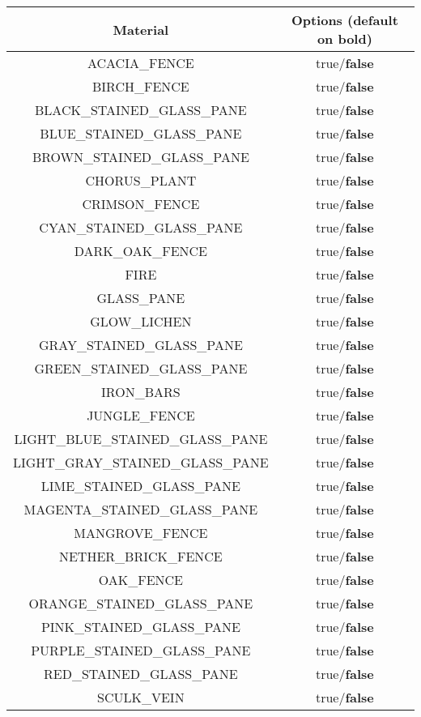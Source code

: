 \begin{longtable}{ |c|c| }
	\hline
	Material & Options (default on bold) \\
	\hline
	\endhead
	ACACIA\_FENCE & true/\textbf{false} \\
	BIRCH\_FENCE & true/\textbf{false} \\
	BLACK\_STAINED\_GLASS\_PANE & true/\textbf{false} \\
	BLUE\_STAINED\_GLASS\_PANE & true/\textbf{false} \\
	BROWN\_STAINED\_GLASS\_PANE & true/\textbf{false} \\
	CHORUS\_PLANT & true/\textbf{false} \\
	CRIMSON\_FENCE & true/\textbf{false} \\
	CYAN\_STAINED\_GLASS\_PANE & true/\textbf{false} \\
	DARK\_OAK\_FENCE & true/\textbf{false} \\
	FIRE & true/\textbf{false} \\
	GLASS\_PANE & true/\textbf{false} \\
	GLOW\_LICHEN & true/\textbf{false} \\
	GRAY\_STAINED\_GLASS\_PANE & true/\textbf{false} \\
	GREEN\_STAINED\_GLASS\_PANE & true/\textbf{false} \\
	IRON\_BARS & true/\textbf{false} \\
	JUNGLE\_FENCE & true/\textbf{false} \\
	LIGHT\_BLUE\_STAINED\_GLASS\_PANE & true/\textbf{false} \\
	LIGHT\_GRAY\_STAINED\_GLASS\_PANE & true/\textbf{false} \\
	LIME\_STAINED\_GLASS\_PANE & true/\textbf{false} \\
	MAGENTA\_STAINED\_GLASS\_PANE & true/\textbf{false} \\
	MANGROVE\_FENCE & true/\textbf{false} \\
	NETHER\_BRICK\_FENCE & true/\textbf{false} \\
	OAK\_FENCE & true/\textbf{false} \\
	ORANGE\_STAINED\_GLASS\_PANE & true/\textbf{false} \\
	PINK\_STAINED\_GLASS\_PANE & true/\textbf{false} \\
	PURPLE\_STAINED\_GLASS\_PANE & true/\textbf{false} \\
	RED\_STAINED\_GLASS\_PANE & true/\textbf{false} \\
	SCULK\_VEIN & true/\textbf{false} \\

\end{longtable}
